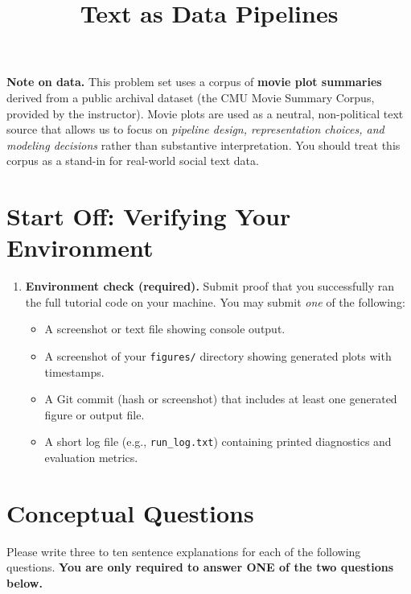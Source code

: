 \documentclass[11pt]{article}
\title{Text as Data Pipelines}
\author{}
\date{}
\begin{document}
\maketitle

\noindent \textbf{Note on data.}  
This problem set uses a corpus of \textbf{movie plot summaries} derived from a public archival dataset (the CMU Movie Summary Corpus, provided by the instructor). Movie plots are used as a neutral, non-political text source that allows us to focus on \emph{pipeline design, representation choices, and modeling decisions} rather than substantive interpretation. You should treat this corpus as a stand-in for real-world social text data.

\section*{Start Off: Verifying Your Environment}

\begin{enumerate}
\item \textbf{Environment check (required).}  
Submit proof that you successfully ran the full tutorial code on your machine. You may submit \emph{one} of the following:
\begin{itemize}
  \item A screenshot or text file showing console output.
  \item A screenshot of your \texttt{figures/} directory showing generated plots with timestamps.
  \item A Git commit (hash or screenshot) that includes at least one generated figure or output file.
  \item A short log file (e.g., \texttt{run\_log.txt}) containing printed diagnostics and evaluation metrics.
\end{itemize}
\end{enumerate}


\section*{Conceptual Questions}

Please write three to ten sentence explanations for each of the following questions.  
\textbf{You are only required to answer ONE of the two questions below.} \bigskip
\end{document}

